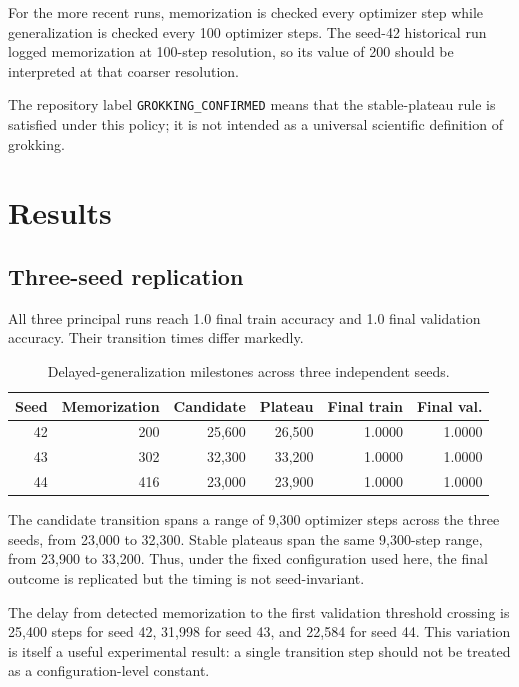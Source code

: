\documentclass[11pt]{article}
\begin{document}
For the more recent runs, memorization is checked every optimizer step while generalization is checked every 100 optimizer steps. The seed-42 historical run logged memorization at 100-step resolution, so its value of 200 should be interpreted at that coarser resolution.

The repository label \texttt{GROKKING\_CONFIRMED} means that the stable-plateau rule is satisfied under this policy; it is not intended as a universal scientific definition of grokking.

\section{Results}

\subsection{Three-seed replication}
All three principal runs reach 1.0 final train accuracy and 1.0 final validation accuracy. Their transition times differ markedly.

\begin{table}[h]
\centering
\caption{Delayed-generalization milestones across three independent seeds.}
\label{tab:three_seeds}
\begin{tabular}{rrrrrr}
\toprule
Seed & Memorization & Candidate & Plateau & Final train & Final val. \\
\midrule
42 & 200 & 25{,}600 & 26{,}500 & 1.0000 & 1.0000 \\
43 & 302 & 32{,}300 & 33{,}200 & 1.0000 & 1.0000 \\
44 & 416 & 23{,}000 & 23{,}900 & 1.0000 & 1.0000 \\
\bottomrule
\end{tabular}
\end{table}

The candidate transition spans a range of 9{,}300 optimizer steps across the three seeds, from 23{,}000 to 32{,}300. Stable plateaus span the same 9{,}300-step range, from 23{,}900 to 33{,}200. Thus, under the fixed configuration used here, the final outcome is replicated but the timing is not seed-invariant.

The delay from detected memorization to the first validation threshold crossing is 25{,}400 steps for seed 42, 31{,}998 for seed 43, and 22{,}584 for seed 44. This variation is itself a useful experimental result: a single transition step should not be treated as a configuration-level constant.
\end{document}
